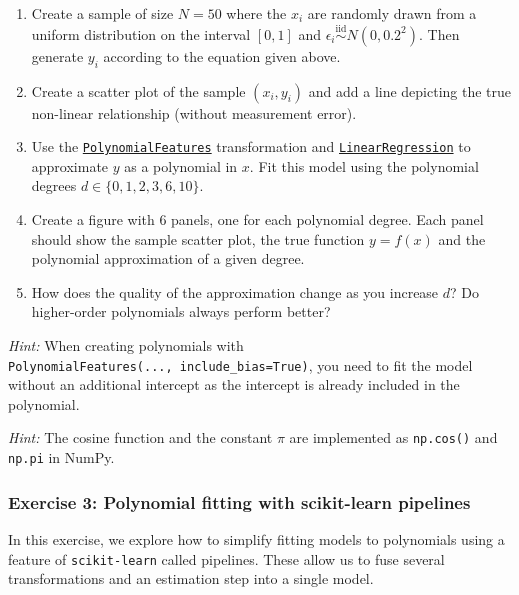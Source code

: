 \documentclass{scrartcl}
\providecommand{\tightlist}{%
      \setlength{\itemsep}{0pt}\setlength{\parskip}{0pt}}
\begin{document}
\begin{enumerate}
\def\labelenumi{\arabic{enumi}.}
\tightlist
\item
  Create a sample of size \(N=50\) where the \(x_i\) are randomly drawn
  from a uniform distribution on the interval \([0, 1]\) and
  \(\epsilon_i \stackrel{\text{iid}}{\sim} N(0, 0.2^2)\). Then generate
  \(y_i\) according to the equation given above.
\item
  Create a scatter plot of the sample \((x_i, y_i)\) and add a line
  depicting the true non-linear relationship (without measurement
  error).
\item
  Use the
  \href{https://scikit-learn.org/stable/modules/generated/sklearn.preprocessing.PolynomialFeatures.html}{\texttt{PolynomialFeatures}}
  transformation and
  \href{https://scikit-learn.org/stable/modules/generated/sklearn.linear_model.LinearRegression.html}{\texttt{LinearRegression}}
  to approximate \(y\) as a polynomial in \(x\). Fit this model using
  the polynomial degrees \(d \in \{0, 1, 2, 3, 6, 10\}\).
\item
  Create a figure with 6 panels, one for each polynomial degree. Each
  panel should show the sample scatter plot, the true function
  \(y = f(x)\) and the polynomial approximation of a given degree.
\item
  How does the quality of the approximation change as you increase
  \(d\)? Do higher-order polynomials always perform better?
\end{enumerate}

\emph{Hint:} When creating polynomials with
\texttt{PolynomialFeatures(...,\ include\_bias=True)}, you need to fit
the model without an additional intercept as the intercept is already
included in the polynomial.

\emph{Hint:} The cosine function and the constant \(\pi\) are
implemented as \texttt{np.cos()} and \texttt{np.pi} in NumPy.

    \hypertarget{exercise-3-polynomial-fitting-with-scikit-learn-pipelines}{%
\subsubsection{Exercise 3: Polynomial fitting with scikit-learn
pipelines}\label{exercise-3-polynomial-fitting-with-scikit-learn-pipelines}}

In this exercise, we explore how to simplify fitting models to
polynomials using a feature of \texttt{scikit-learn} called pipelines.
These allow us to fuse several transformations and an estimation step
into a single model.
\end{document}
